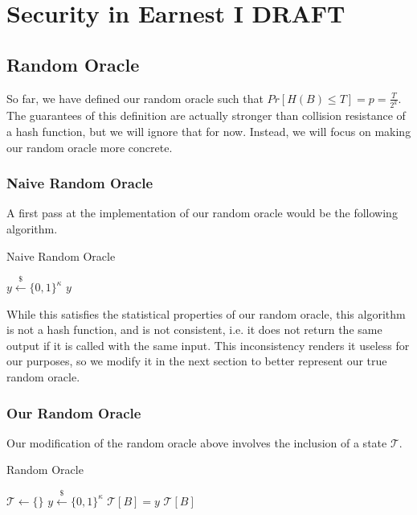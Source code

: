 \chapter{Security in Earnest I \small{\textsf{DRAFT}}}

\section{Random Oracle}
So far, we have defined our random oracle such that $Pr[H(B) \leq T] = p = \frac{T}{2^k}$. The guarantees of this definition are actually stronger than collision resistance of a hash function, but we will ignore that for now. Instead, we will focus on making our random oracle more concrete.

\subsection{Naive Random Oracle}
A first pass at the implementation of our random oracle would be the following algorithm.
\begin{algorithm}
\caption{Naive Random Oracle}
\begin{algorithmic}
    \State $y \overset{\$}{\gets} \{0, 1\}^\kappa$
    \State \Return $y$
\EndProcedure
\end{algorithmic}
\end{algorithm}

While this satisfies the statistical properties of our random oracle, this algorithm is not a hash function, and is not consistent, i.e. it does not return the same output if it is called with the same input. This inconsistency renders it useless for our purposes, so we modify it in the next section to better represent our true random oracle.

\subsection{Our Random Oracle}
Our modification of the random oracle above involves the inclusion of a state $\mathcal{T}$.
\begin{algorithm}
\caption{Random Oracle}
\begin{algorithmic}
\State $\mathcal{T} \gets \{\}$
        \State $y \overset{\$}{\gets} \{0, 1\}^\kappa$
        \State $\mathcal{T}[B] = y$
    \EndIf
    \State \Return $\mathcal{T}[B]$
\EndProcedure
\end{algorithmic}
\end{algorithm}


